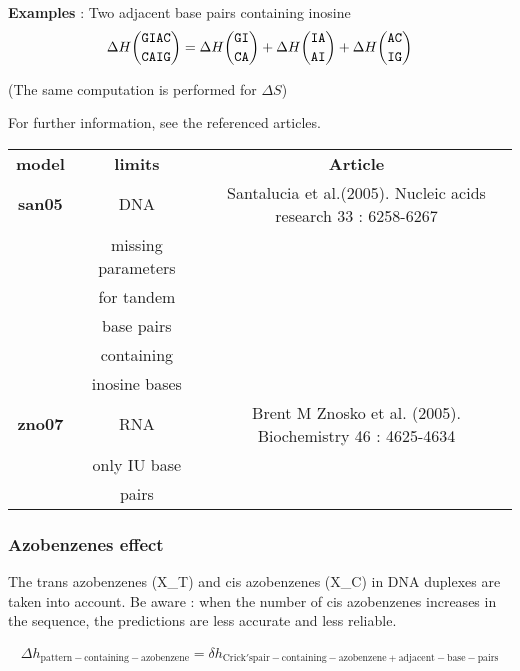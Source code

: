 \documentclass{article}
\begin{document}
\textbf{Examples} : Two adjacent base pairs containing inosine
\begin{multline*}
\Delta H {\mbox{\texttt{GIAC}} \choose \mbox{\texttt{CAIG}}} = 
\Delta H {\mbox{\texttt{GI}} \choose \mbox{\texttt{CA}}} +
\Delta H {\mbox{\texttt{IA}} \choose \mbox{\texttt{AI}}} +
\Delta H {\mbox{\texttt{AC}} \choose \mbox{\texttt{IG}}}\\
\end{multline*}

       (The same computation is performed for $\Delta S$) 
       
For further information, see the referenced articles.

\begin{table}[h]
\begin{tabular}[h]{| c | c | c |}
\textbf{model} & \textbf{limits} & \textbf{Article} \\
\textbf{san05} & DNA & Santalucia et al.(2005). Nucleic acids research 33 : 6258-6267 \\
 & missing parameters & \\
 & for tandem & \\
 & base pairs & \\
 & containing & \\
 & inosine bases & \\
\textbf{zno07} & RNA & Brent M Znosko et al. (2005). Biochemistry 46 : 4625-4634 \\
 & only IU base & \\ 
 & pairs & \\
\end{tabular}
\end{table}

\subsubsection{Azobenzenes effect}

The trans azobenzenes (X\_T) and cis azobenzenes (X\_C) in DNA duplexes are taken 
into account. Be aware : when the number of cis azobenzenes increases in the sequence, 
the predictions are less accurate and less reliable.

\begin{multline*}
  \Delta{}h_\mathrm{pattern-containing-azobenzene} =
  \delta{}h_\mathrm{Crick's pair-containing-azobenzene+adjacent-base-pairs}\\
\end{multline*}
\end{document}
